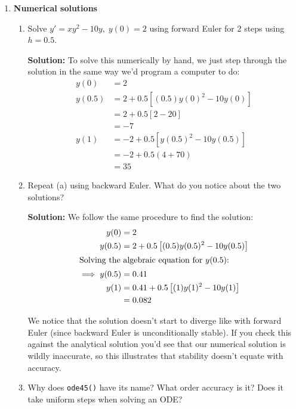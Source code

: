 \documentclass[letterpaper, fontsize=12pt]{scrartcl} %
\numberwithin{equation}{section} %
\numberwithin{figure}{section} %
\numberwithin{table}{section} %
\begin{document}
\begin{enumerate}
\begin{enumerate}[label = (\alph*)]
%


\end{enumerate}

\item \textbf{Numerical solutions}
\begin{enumerate}[label = (\alph*)]
\item Solve $y' = xy^2 - 10y, \; y(0) = 2$ using forward Euler for 2 steps using $ h = 0.5$. 
\par \textbf{Solution:} To solve this numerically by hand, we just step through the solution in the same way we'd program a computer to do:
\begin{align*}
y(0) &= 2 \\
y(0.5) &= 2 + 0.5\left[(0.5)y(0)^2 - 10y(0) \right] \\
&= 2 + 0.5 [2 - 20]\\
&= -7 \\
y(1) &= -2 + 0.5\left[y(0.5)^2 - 10y(0.5) \right] \\
&= -2 + 0.5(4 +70) \\
&= 35
\end{align*}

\item Repeat (a) using backward Euler. What do you notice about the two solutions?
\par \textbf{Solution:} We follow the same procedure to find the solution:
\begin{align*}
y(0) &= 2 \\
y(0.5) &= 2 + 0.5\left[ (0.5)y(0.5)^2 - 10y(0.5) \right] \\
\intertext{Solving the algebraic equation for $y(0.5)$:}
\implies y(0.5) &= 0.41 \\
y(1) &= 0.41 + 0.5\left[ (1)y(1)^2 - 10y(1) \right] \\
&= 0.082
\end{align*}

We notice that the solution doesn't start to diverge like with forward Euler (since backward Euler is unconditionally stable). If you check this against the analytical solution you'd see that our numerical solution is wildly inaccurate, so this illustrates that stability doesn't equate with accuracy.

\item Why does \texttt{ode45()} have its name? What order accuracy is it? Does it take uniform steps when solving an ODE? 


\end{enumerate}
\end{enumerate}
\end{document}
